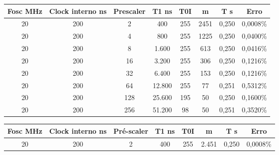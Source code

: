 \documentclass{article}
\begin{document}
\begin{figure}[H]
\begin{tabular}{|c|c|c|c|c|c|c|c|}
\hline
\rowcolor[HTML]{FFD966} 
\textbf{Fosc MHz} & \textbf{Clock interno ns} & \textbf{Prescaler} & \textbf{T1 ns} & \textbf{T0I} & \textbf{m} & \textbf{T s} & \textbf{Erro} \\ \hline
\rowcolor[HTML]{FFFFFF} 
20                & 200                       & 2                   & 400            & 255          & 2451        & 0,250        & 0,0008\%     \\ \hline
\rowcolor[HTML]{FFFFFF} 
20                & 200                       & 4                   & 800            & 255          & 1225       & 0,250        & 0,0400\%     \\ \hline
\rowcolor[HTML]{FFFFFF} 
20                & 200                       & 8                   & 1.600          & 255          & 613        & 0,250        & 0,0416\%     \\ \hline
\rowcolor[HTML]{FFFFFF} 
20                & 200                       & 16                  & 3.200          & 255          & 306        & 0,250        & 0,1216\%     \\ \hline
\rowcolor[HTML]{FFFFFF} 
20                & 200                       & 32                  & 6.400          & 255          & 153        & 0,250        & 0,1216\%      \\ \hline
\rowcolor[HTML]{FFFFFF} 
20                & 200                       & 64                  & 12.800         & 255          & 77         & 0,251        & 0,5312\%      \\ \hline
\rowcolor[HTML]{FFFFFF} 
20                & 200                       & 128                 & 25.600         & 195          & 50         & 0,250        & 0,1600\%      \\ \hline
\rowcolor[HTML]{FFFFFF} 
20                & 200                       & 256                 & 51.200         & 98           & 50         & 0,251        & 0,3520\%      \\ \hline
\end{tabular}
\iffalse
\begin{tabular}{|c|c|c|c|c|c|c|c|}
\hline
\rowcolor[HTML]{FFD966} 
\textbf{Fosc MHz} & \textbf{Clock interno ns} & \textbf{Pré-scaler} & \textbf{T1 ns} & \textbf{T0I} & \textbf{m} & \textbf{T s} & \textbf{Erro} \\ \hline
\rowcolor[HTML]{FFFFFF} 
20                & 200                       & 2                   & 400            & 255          & 2.451      & 0,250        & 0,0008\%      \\ \hline

\end{tabular}
\end{figure}
\end{document}
